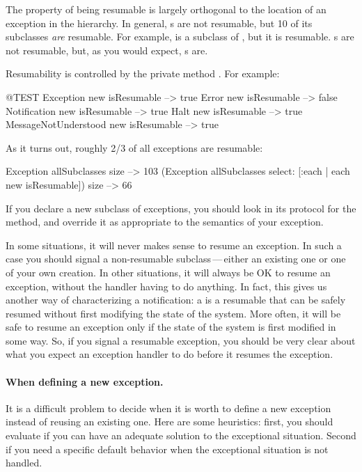 \documentclass[a4paper,10pt,twoside]{book}
\begin{document}
The property of being resumable is largely orthogonal to the location of an exception in the hierarchy.   In general, s are not resumable, but 10 of its subclasses \emph{are} resumable.  For example,  is a subclass of , but it is resumable.  s are not resumable, but, as you would expect, s are. 

Resumability is controlled by the private  method . 
For example:
\begin{code}{@TEST}
Exception new isResumable --> true
Error new isResumable --> false
Notification new isResumable --> true
Halt new isResumable --> true
MessageNotUnderstood new isResumable --> true
\end{code}

As it turns out, roughly 2/3 of all exceptions are resumable:
\begin{code}{}
Exception allSubclasses size --> 103
(Exception allSubclasses select: [:each | each new isResumable]) size --> 66
\end{code}
If you declare a new subclass of exceptions, you should look in its protocol for the  method, and override it as appropriate to the semantics of your exception.

In some situations, it will never makes sense to resume an exception.
In such a case you should signal a non-resumable subclass\,---\,either an existing one or one of your own creation.
In other situations, it will always be OK to resume an exception, without the handler having to do anything.
In fact, this gives us another way of characterizing a notification:
a  is a resumable  that can be safely resumed without first modifying the state of the system.
More often, it will be safe to resume an exception only if the state of the system is first modified in some way.
So, if you signal a resumable exception, you should be very clear about what you expect an exception handler to do before it resumes the exception.

\paragraph{When defining a new exception.} It is a difficult problem to decide when it is worth to define a new exception instead of reusing an existing one. Here are some heuristics: first, you should evaluate if you can have an adequate solution to the exceptional situation. Second if you need a specific default behavior when the exceptional situation is not handled.
\end{document}
